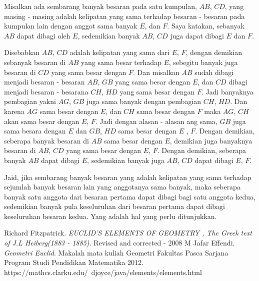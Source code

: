 \documentclass[a4paper]{book}
\begin{document}
Misalkan ada sembarang banyak besaran pada satu kumpulan, $AB$, $CD$, 
yang masing - masing adalah kelipatan yang sama terhadap besaran - besaran 
pada kumpulan lain dengan anggot sama banyak $E$, dan $F$. Saya katakan, 
sebanyak $AB$ dapat dibagi oleh $E$, sedemikian banyak
$AB$, $CD$ juga dapat dibagi $E$ dan $F$.

Disebabkan $AB$, $CD$ adalah kelipatan yang sama dari $E$, $F$, dengan
demikian sebanyak besaran di $AB$ yang sama besar terhadap $E$, sebegitu
banyak juga besaran di $CD$ yang sama besar dengan $F$. Dan misalkan
$AB$ sudah dibagi menjadi besaran - besaran $AB$, $GB$ yang sama besar dengan
$E$, dan $CD$ dibagi menjadi besaran - besarana $CH$, $HD$ yang sama besar
dengan $F$. Jadi banyaknya pembagian yakni $AG$, $GB$ juga sama banyak dengan
pembagian $CH$, $HD$. Dan karena $AG$ sama besar dengan $E$, dan $CH$ sama 
besar dengan $F$ maka $AG$, $CH$ akan sama besar dengan $E$, $F$. Jadi dengan
alasan - alasan ang sama,  $GB$ juga sama besara dengan $E$ dan $GB$, $HD$ sama
besar dengan $E$ , $F$. Dengan demikian, seberapa banyak besaran di $AB$ sama
besar dengan $E$, demikian juga banyaknya besaran di $AB$, $CD$ yang sama besar
dengan $E$, $F$. Dengan demikian, seberapa banyak $AB$ dapat dibagi $E$, 
sedemikian banyak juga $AB$, $CD$ dapat dibagi $E$, $F$.

Jaid, jika sembarang banyak besaran yang adalah kelipatan yang sama terhadap
sejumlah banyak besaran lain yang anggotanya sama banyak, maka seberapa banyak
satu anggota dari besaran pertama dapat dibagi bagi satu anggota kedua, 
sedemikian banyak pula keseluruhan dari besaran pertama dapat dibagi 
keseluruhan besaran kedua. Yang adalah hal yang perlu ditunjukkan.

\begin{thebibliography}{9} 
Richard Fitzpatrick.
\textit{EUCLID’S ELEMENTS OF GEOMETRY , The Greek text of J.L Heiberg(1883 - 1885)}.
Revised and corrected - 2008 
M Jafar Effendi.
\textit{Geometri Euclid}.
Makalah mata kuliah Geometri Fakultas Pasca Sarjana Program Studi Pendidikan Matematika 2012.
https://mathcs.clarku.edu/~djoyce/java/elements/elements.html 
\end{thebibliography}
\end{document}
